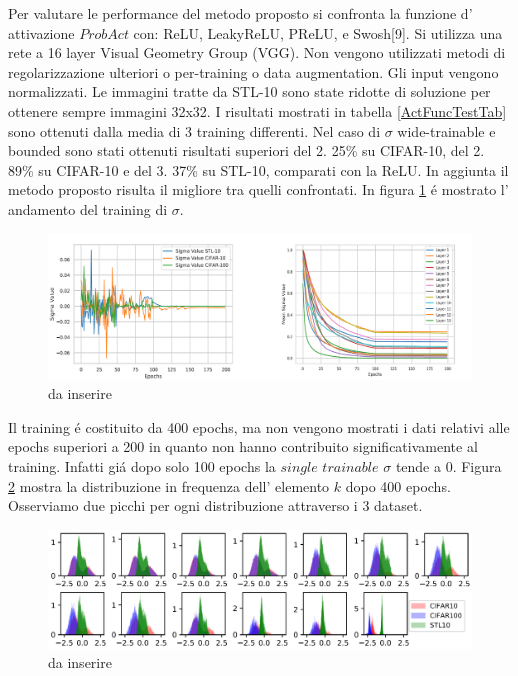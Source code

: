 \documentclass[a4paper,10pt]{article}
\begin{document}
  Per valutare le performance del metodo proposto si confronta la funzione d' attivazione $ProbAct$ con: ReLU, LeakyReLU, PReLU, e Swosh[9]. Si utilizza una rete a 16 layer Visual Geometry Group (VGG). Non vengono utilizzati metodi di regolarizzazione ulteriori o per-training o data augmentation. Gli input vengono normalizzati. Le immagini tratte da STL-10 sono state ridotte di soluzione per ottenere sempre immagini 32x32.
  I risultati mostrati in tabella \ref{ActFuncTestTab} sono ottenuti dalla media di 3 training differenti. Nel caso di $\sigma$ wide-trainable e bounded sono stati ottenuti risultati superiori del 2. 25\% su CIFAR-10, del 2. 89\% su CIFAR-10 e del 3. 37\% su STL-10, comparati con la ReLU. In aggiunta il metodo proposto risulta il migliore tra quelli confrontati.
  In figura \ref{SigmaTrainingpng} \'e mostrato l' andamento del training di $\sigma$. 
  \begin{figure}[h!]
   \centering
   \includegraphics[width=\linewidth]{SigmaTraining.png} 
   \caption{da inserire}
  \label{SigmaTrainingpng}
  \end{figure}

  
  Il training \'e costituito da 400 epochs, ma non vengono mostrati i dati relativi alle epochs superiori a 200 in quanto non hanno contribuito significativamente al training. Infatti gi\'a dopo solo 100 epochs la $single$ $trainable$ $\sigma$ tende a 0. 
  Figura \ref{kFreqDistrpng} mostra la distribuzione in frequenza dell' elemento $k$ dopo 400 epochs. Osserviamo due picchi per ogni distribuzione attraverso i 3 dataset.  
  \begin{figure}[h!]
   \centering
   \includegraphics[width=\linewidth]{kFreqDistr.png} 
   \caption{da inserire}
  \label{kFreqDistrpng}
  \end{figure}
  
\end{document}
